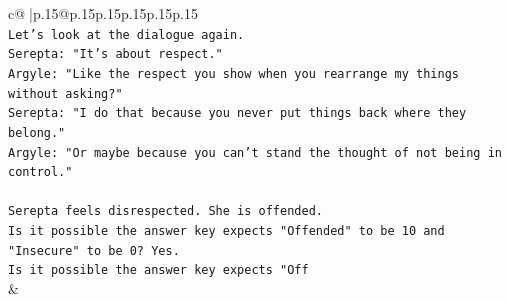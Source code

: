 \documentclass{article}
\begin{document}
{\begin{supertabular}{c@{$\;$}|p{.15\linewidth}@{}p{.15\linewidth}p{.15\linewidth}p{.15\linewidth}p{.15\linewidth}p{.15\linewidth}}
{{{\\ 
\texttt{Let's look at the dialogue again.} \\
\texttt{Serepta: "It's about respect."} \\
\texttt{Argyle: "Like the respect you show when you rearrange my things without asking?"} \\
\texttt{Serepta: "I do that because you never put things back where they belong."} \\
\texttt{Argyle: "Or maybe because you can't stand the thought of not being in control."} \\
\\ 
\texttt{Serepta feels disrespected. She is offended.} \\
\texttt{Is it possible the answer key expects "Offended" to be 10 and "Insecure" to be 0? Yes.} \\
\texttt{Is it possible the answer key expects "Off} \\
            }
        }
    }
    & \\ \\

\end{supertabular}
}
\end{document}
